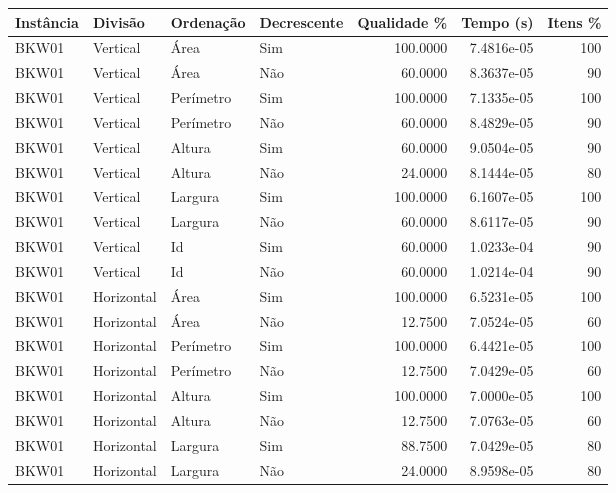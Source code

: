 \begin{tabular}{llllrrr}
    \hline
    Instância & Divisão     & Ordenação & Decrescente & Qualidade \% & Tempo (s)  & Itens \% \\
    \hline
    BKW01     & Vertical    & Área      & Sim         & 100.0000     & 7.4816e-05 & 100      \\
    BKW01     & Vertical    & Área      & Não         & 60.0000      & 8.3637e-05 & 90       \\
    BKW01     & Vertical    & Perímetro & Sim         & 100.0000     & 7.1335e-05 & 100      \\
    BKW01     & Vertical    & Perímetro & Não         & 60.0000      & 8.4829e-05 & 90       \\
    BKW01     & Vertical    & Altura    & Sim         & 60.0000      & 9.0504e-05 & 90       \\
    BKW01     & Vertical    & Altura    & Não         & 24.0000      & 8.1444e-05 & 80       \\
    BKW01     & Vertical    & Largura   & Sim         & 100.0000     & 6.1607e-05 & 100      \\
    BKW01     & Vertical    & Largura   & Não         & 60.0000      & 8.6117e-05 & 90       \\
    BKW01     & Vertical    & Id        & Sim         & 60.0000      & 1.0233e-04 & 90       \\
    BKW01     & Vertical    & Id        & Não         & 60.0000      & 1.0214e-04 & 90       \\
    BKW01     & Horizontal  & Área      & Sim         & 100.0000     & 6.5231e-05 & 100      \\
    BKW01     & Horizontal  & Área      & Não         & 12.7500      & 7.0524e-05 & 60       \\
    BKW01     & Horizontal  & Perímetro & Sim         & 100.0000     & 6.4421e-05 & 100      \\
    BKW01     & Horizontal  & Perímetro & Não         & 12.7500      & 7.0429e-05 & 60       \\
    BKW01     & Horizontal  & Altura    & Sim         & 100.0000     & 7.0000e-05 & 100      \\
    BKW01     & Horizontal  & Altura    & Não         & 12.7500      & 7.0763e-05 & 60       \\
    BKW01     & Horizontal  & Largura   & Sim         & 88.7500      & 7.0429e-05 & 80       \\
    BKW01     & Horizontal  & Largura   & Não         & 24.0000      & 8.9598e-05 & 80       \\

\end{tabular}
